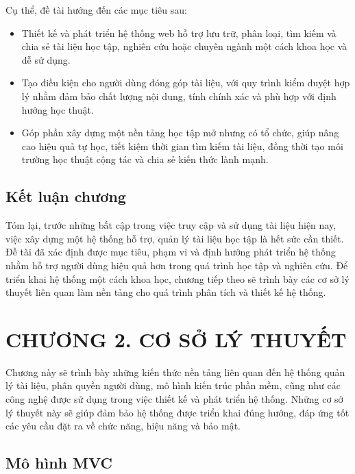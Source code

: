 \documentclass{article}
\begin{document}
	Cụ thể, đề tài hướng đến các mục tiêu sau:

	\begin{itemize}
		\item Thiết kế và phát triển hệ thống web hỗ trợ lưu trữ, phân loại, tìm kiếm và chia sẻ tài liệu học tập, nghiên cứu hoặc chuyên ngành một cách khoa học và dễ sử dụng.
		\item Tạo điều kiện cho người dùng đóng góp tài liệu, với quy trình kiểm duyệt hợp lý nhằm đảm bảo chất lượng nội dung, tính chính xác và phù hợp với định hướng học thuật.
		\item Góp phần xây dựng một nền tảng học tập mở nhưng có tổ chức, giúp nâng cao hiệu quả tự học, tiết kiệm thời gian tìm kiếm tài liệu, đồng thời tạo môi trường học thuật cộng tác và chia sẻ kiến thức lành mạnh.
	\end{itemize}
	
	\subsection{Kết luận chương}
	
	Tóm lại, trước những bất cập trong việc truy cập và sử dụng tài liệu hiện nay, việc xây dựng một hệ thống hỗ trợ, quản lý tài liệu học tập là hết sức cần thiết. Đề tài đã xác định được mục tiêu, phạm vi và định hướng phát triển hệ thống nhằm hỗ trợ người dùng hiệu quả hơn trong quá trình học tập và nghiên cứu. Để triển khai hệ thống một cách khoa học, chương tiếp theo sẽ trình bày các cơ sở lý thuyết liên quan làm nền tảng cho quá trình phân tích và thiết kế hệ thống.
	\newpage
	
	\section*{CHƯƠNG 2. CƠ SỞ LÝ THUYẾT}
	\setcounter{section}{2}
	\setcounter{subsection}{0}
	\setcounter{figure}{0}
	\setcounter{table}{0}
	
	Chương này sẽ trình bày những kiến thức nền tảng liên quan đến hệ thống quản lý tài liệu, phân quyền người dùng, mô hình kiến trúc phần mềm, cũng như các công nghệ được sử dụng trong việc thiết kế và phát triển hệ thống. Những cơ sở lý thuyết này sẽ giúp đảm bảo hệ thống được triển khai đúng hướng, đáp ứng tốt các yêu cầu đặt ra về chức năng, hiệu năng và bảo mật.
	
	\subsection{Mô hình MVC}
	
\end{document}
